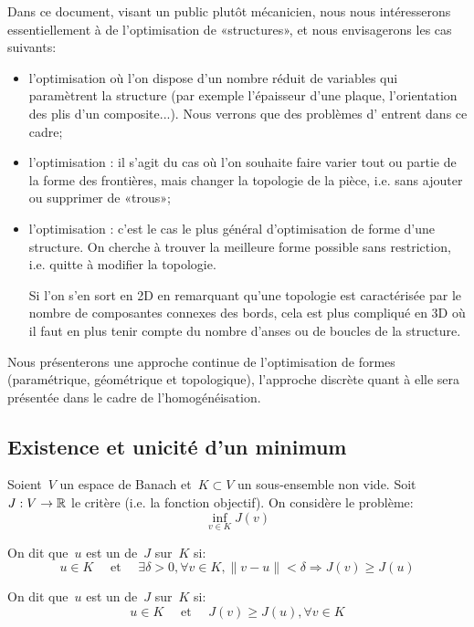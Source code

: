 \medskip
Dans ce document, visant un public plutôt mécanicien, nous nous intéresserons essentiellement à de l'optimisation de «structures», et nous envisagerons les cas suivants:
\begin{itemize}
   \item l'optimisation  où l'on dispose d'un nombre réduit de variables qui paramètrent la structure (par exemple l'épaisseur d'une plaque, l'orientation des plis d'un composite...). Nous verrons que des problèmes d' entrent dans ce cadre;
   \item l'optimisation : il s'agit du cas où l'on souhaite faire varier tout ou partie de la forme des frontières, mais  changer la topologie de la pièce, i.e. sans ajouter ou supprimer de «trous»;
   \item l'optimisation : c'est le cas le plus général d'optimisation de forme d'une structure. On cherche à trouver la meilleure forme possible sans restriction, i.e. quitte à modifier la topologie.

   Si l'on s'en sort en 2D en remarquant qu'une topologie est caractérisée par le nombre de composantes connexes des bords, cela est plus compliqué en 3D où il faut en plus tenir compte du nombre d'anses ou de boucles de la structure.
\end{itemize}

Nous présenterons une approche continue de l'optimisation de formes (paramétrique, géométrique et topologique), l'approche discrète quant à elle sera présentée dans le cadre de l'homogénéisation.


\medskip
\subsection{Existence et unicité d'un minimum}
\begin{definition}[Minima]
Soient~$V$ un espace de Banach et~$K\subset V$ un sous-ensemble non vide. Soit~$J: V\rightarrow\mathbb R$ le critère (i.e. la fonction objectif). On considère le problème:
\begin{equation}
\inf_{v\in K} J(v)
\end{equation}

On dit que~$u$ est un  de~$J$ sur~$K$ si:
\begin{equation}
u\in K \quad\text{ et }\quad \exists\delta>0, \forall v\in K, 
\|v-u\|<\delta \Rightarrow J(v)\ge J(u)
\end{equation}

On dit que~$u$ est un  de~$J$ sur~$K$ si:
\begin{equation}
u\in K \quad\text{ et }\quad J(v)\ge J(u), \forall v\in K
\end{equation}
\end{definition}

